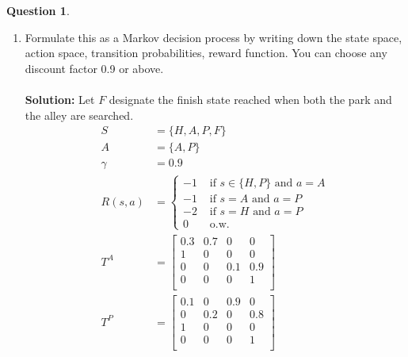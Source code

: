 \documentclass{article}
\theoremstyle{definition}
\newtheorem{question}[thm]{Question}
\begin{document}
\begin{question}
    \begin{enumerate}[label=\alph*)]
        \item Formulate this as a Markov decision process by writing down the state space, action space, transition probabilities, reward function. You can choose any discount factor 0.9 or above.
         \\ \\
        \noindent \textbf{Solution: }
        Let $F$ designate the finish state reached when both the park and the alley are searched.
        \begin{align*}
            S &= \{H,A,P,F\} \\
            A &= \{A,P\}\\
            \gamma &= 0.9\\
            R(s,a) &= 
            \begin{cases}
                -1& \text{ if } s\in\{H,P\}\text{ and } a = A\\
                -1& \text{ if } s = A\text{ and } a = P\\
                -2& \text{ if } s = H\text{ and } a = P\\
                0 & \text{ o.w.}
            \end{cases}\\
            T^A &= \begin{bmatrix}
                            0.3 & 0.7 & 0 & 0\\
                            1 & 0 & 0 & 0\\
                            0 & 0 & 0.1 & 0.9\\
                            0 & 0 & 0 & 1\\
                         \end{bmatrix}\\
             T^P &= \begin{bmatrix}
                            0.1 & 0 & 0.9 & 0\\
                            0 & 0.2 & 0 & 0.8\\
                            1 & 0 & 0 & 0\\
                            0 & 0 & 0 & 1\\
                         \end{bmatrix}\\

\end{align*}
\end{enumerate}
\end{question}
\end{document}
